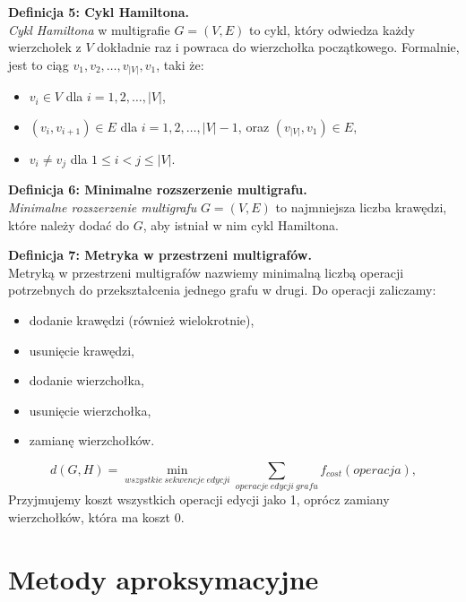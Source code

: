 \vspace{1em}

\noindent \textbf{Definicja 5: Cykl Hamiltona.} \\
\emph{Cykl Hamiltona} w multigrafie \( G = (V, E) \) to cykl, który odwiedza każdy wierzchołek z \( V \) dokładnie raz i powraca do wierzchołka początkowego. Formalnie, jest to ciąg \( v_1, v_2, \dots, v_{|V|}, v_1 \), taki że:
\begin{itemize}
    \item \( v_i \in V \) dla \( i = 1, 2, \dots, |V| \),
    \item \( (v_i, v_{i+1}) \in E \) dla \( i = 1, 2, \dots, |V|-1 \), oraz \( (v_{|V|}, v_1) \in E \),
    \item \( v_i \neq v_j \) dla \( 1 \leq i < j \leq |V| \).
\end{itemize}

\vspace{1em}

\noindent \textbf{Definicja 6: Minimalne rozszerzenie multigrafu.} \\
\emph{Minimalne rozszerzenie multigrafu} \( G = (V, E) \) to najmniejsza liczba krawędzi, które należy dodać do \( G \), aby istniał w nim cykl Hamiltona.

\vspace{1em}

\noindent \textbf{Definicja 7: Metryka w przestrzeni multigrafów.} \\

Metryką w przestrzeni multigrafów nazwiemy minimalną liczbą operacji potrzebnych do przekształcenia jednego grafu w drugi. Do operacji zaliczamy:
\begin{itemize}
    \item dodanie krawędzi (również wielokrotnie),
    \item usunięcie krawędzi,
    \item dodanie wierzchołka,
    \item usunięcie wierzchołka,
    \item zamianę wierzchołków.
\end{itemize}
\[
    d(G, H) = \min_{wszystkie \ sekwencje \ edycji} \sum_{operacje \ edycji \ grafu} f_{cost}(operacja),
\]
Przyjmujemy koszt wszystkich operacji edycji jako 1, oprócz zamiany wierzchołków, która ma koszt 0.

\vspace{1em}

\section{Metody aproksymacyjne}

